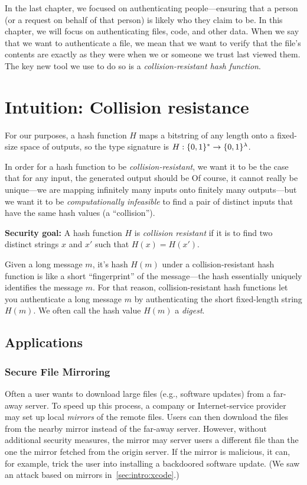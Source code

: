 In the last chapter, we focused on authenticating people---ensuring that
a person (or a request on behalf of that person) is likely who they claim to be.
In this chapter, we will focus on authenticating
files, code, and other data.
When we say that we want to authenticate a file,
we mean that we want to verify that the file's
contents are exactly as they were when we or
someone we trust last viewed them.
The key new tool we use to do so is a \textit{collision-resistant hash function}. 

\section{Intuition: Collision resistance}
For our purposes, a hash function $H$ 
maps a bitstring of any length onto a fixed-size space of outputs,
so the type signature is $H: \{0,1\}^* \rightarrow \{0,1\}^{\lambda}$.

In order for a hash function to be \textit{collision-resistant}, we want it to be the case that for any input, the generated output should be  Of course, it cannot really be unique---we are mapping infinitely many inputs onto finitely many outputs---but we want it to be \textit{computationally infeasible} to find a 
pair of distinct inputs that have the same hash values (a ``collision'').

\begin{framed}
\noindent
\textbf{Security goal:} A hash function $H$ is \emph{collision resistant} if
it is  to find two distinct strings
$x$ and $x'$ such that $H(x) = H(x')$.
\end{framed}

Given a long message $m$, it's hash $H(m)$ under a collision-resistant
hash function is like a short ``fingerprint'' of the message---the
hash essentially uniquely identifies the message $m$.
For that reason, collision-resistant hash functions let you authenticate 
a long message $m$ by authenticating the  short fixed-length string $H(m)$.
We often call the hash value $H(m)$ a \emph{digest}.

\subsection{Applications}
\subsubsection{Secure File Mirroring}
Often a user wants to download large files (e.g., software updates) from a far-away server.
To speed up this process, a company or Internet-service provider may set up local \emph{mirrors}
of the remote files.
Users can then download the files from the nearby mirror instead of the far-away server.
However, without additional security measures, the mirror may 
server users a different file than the one the mirror fetched from the origin server.
If the mirror is malicious, it can, for example, trick the user into installing
a backdoored software update.
(We saw an attack based on mirrors in~\cref{sec:intro:xcode}.)


